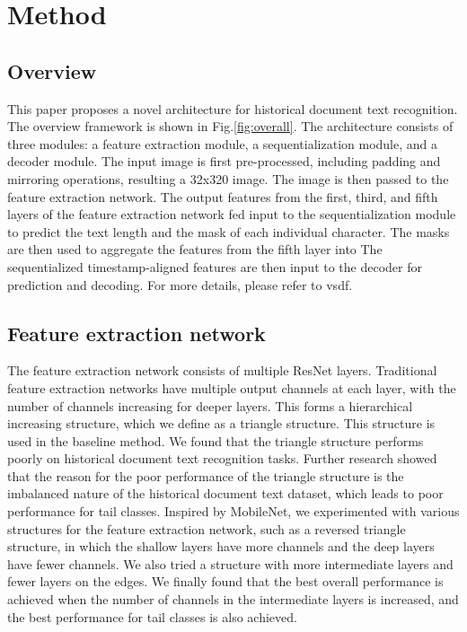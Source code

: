 
\section{Method}

\subsection{Overview}
 

This paper proposes a novel architecture for historical document text recognition. The overview framework is shown in Fig.\ref{fig:overall}. The architecture consists of three modules: a feature extraction module, a sequentialization module, and a decoder module. The input image is first pre-processed, including padding and mirroring operations, resulting a 32x320 image. 
The image is then passed to the feature extraction network. The output features from the first, third, and fifth layers of the feature extraction network fed input to the sequentialization module to predict the text length and the mask of each individual character. The masks are then used to aggregate the features from the fifth layer into 
The sequentialized timestamp-aligned features are then input to the decoder for prediction and decoding. For more details, please refer to vsdf\cite{vsdf}.

\subsection{Feature extraction network}

The feature extraction network consists of multiple ResNet layers. Traditional feature extraction networks have multiple output channels at each layer, with the number of channels increasing for deeper layers. This forms a hierarchical increasing structure, which we define as a triangle structure. This structure is used in the baseline method. We found that the triangle structure performs poorly on historical document text recognition tasks. Further research showed that the reason for the poor performance of the triangle structure is the imbalanced nature of the historical document text dataset, which leads to poor performance for tail classes. Inspired by MobileNet, we experimented with various structures for the feature extraction network, such as a reversed triangle structure, in which the shallow layers have more channels and the deep layers have fewer channels. We also tried a structure with more intermediate layers and fewer layers on the edges. We finally found that the best overall performance is achieved when the number of channels in the intermediate layers is increased, and the best performance for tail classes is also achieved.


